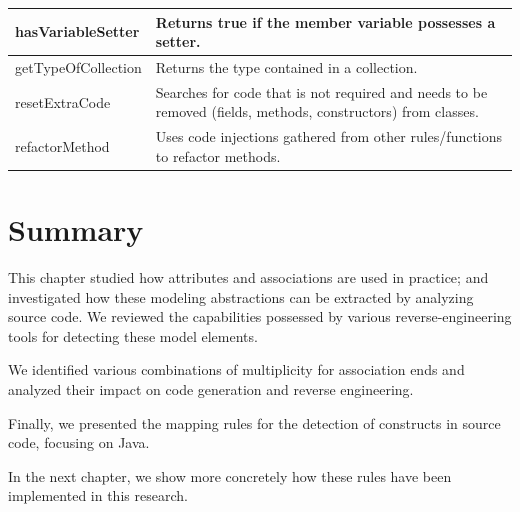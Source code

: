 \begin{table}[h]
\begin{tabular}{l|p{8cm}}
\rowcolor{aliceblue}
        hasVariableSetter & Returns true if the member variable possesses a setter. 
\\    \hline     
\rowcolor{aliceblue}  
		getTypeOfCollection& Returns the type contained in a collection. 
\\    \hline       
\rowcolor{aliceblue} 
		resetExtraCode & Searches for code that is not required and needs to be removed (fields, methods, constructors) from classes. 
\\  \hline
\rowcolor{aliceblue} 
 		refactorMethod & Uses code injections gathered from other rules/functions to refactor methods.\\ 
\bottomrule
\end{tabular}
\end{table}


\section{Summary}

This chapter  studied how attributes and associations are used in practice; and investigated how these modeling abstractions can be extracted by analyzing source code. We reviewed
the capabilities possessed by various reverse-engineering tools for detecting these model elements. 

We identified various  combinations of multiplicity for association ends and analyzed their impact on code generation and reverse engineering. 

Finally, we presented the  mapping rules for the detection of constructs in source code, focusing on Java.

In the next chapter, we show more concretely how these rules have been implemented in this research.


